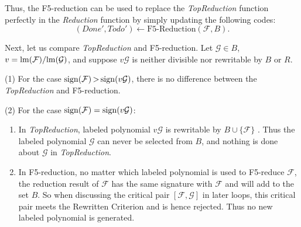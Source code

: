 \documentclass[preprint,authoryear,3p,12pt]{elsarticle}
\def\lm{{\rm lm}}
\def\sus{{\,>\,}}
\def\s{{\rm{sign}}}
\def\lla{{\longleftarrow}}
\begin{document}
Thus, the F5-reduction can be used to replace the {\em TopReduction} function perfectly in the {\em Reduction} function by simply
updating the following codes:
$$(Done', Todo') \lla \mbox{F5-Reduction}({\mathcal F}, B).$$

Next, let us compare  {\em TopReduction} and F5-reduction.  Let ${\mathcal G}\in B$, $v=\lm({\mathcal F})/\lm({\mathcal G})$, and
suppose  $v{\mathcal G}$ is neither  divisible    nor rewritable by $B$ or $R$.

(1) For the case $\s({\mathcal F}) \sus \s(v{\mathcal G})$, there is
no difference between the {\em TopReduction} and F5-reduction.

(2) For the case $\s({\mathcal F}) = \s(v{\mathcal G})$:

\begin{enumerate}

\item[$\bullet$] In {\em TopReduction},
labeled polynomial $v{\mathcal G}$ is rewritable by $B\cup \{{\mathcal F}\}$ . Thus the labeled polynomial ${\mathcal G}$ can
never be selected from $B$, and nothing is done about ${\mathcal G}$ in {\em TopReduction}.

\item[$\bullet$] In F5-reduction, no matter which labeled polynomial is used
to F5-reduce ${\mathcal F}$, the reduction result of ${\mathcal F}$
has the same signature with ${\mathcal F}$ and will add to the set
$B$. So when discussing the critical pair $[{\mathcal F}, {\mathcal
G}]$ in later loops, this critical pair meets the Rewritten
Criterion  and is hence rejected. Thus no new labeled polynomial is
generated.
\end{enumerate}
\end{document}
